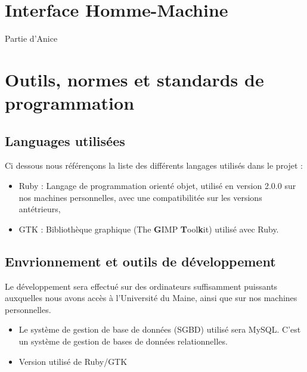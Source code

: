 \documentclass[11pt]{article}
\begin{document}
\newpage %

\section{Interface Homme-Machine}

Partie d'Anice

\newpage

\section{Outils, normes et standards de programmation}

\subsection{Languages utilisées}

Ci dessous nous référençons la liste des différents langages utilisés dans le projet : 

\begin{itemize}
	\item Ruby : Langage de programmation orienté objet, utilisé en version 2.0.0 sur nos machines personnelles, avec une compatibilitée sur les versions antétrieurs,
	\item GTK : Bibliothèque graphique (The \textbf{G}IMP \textbf{T}ool\textbf{k}it) utilisé avec Ruby.
\end{itemize}

\subsection{Envrionnement et outils de développement}

Le développement sera effectué sur des ordinateurs suffisamment puissants auxquelles nous avons accès à l'Université du Maine, ainsi que sur nos machines personnelles.

\begin{itemize}
		\item Le système de gestion de base de données (SGBD) utilisé sera MySQL. C'est un système de gestion de bases de données relationnelles.
		\item Version utilisé de Ruby/GTK
\end{itemize}
\end{document}
